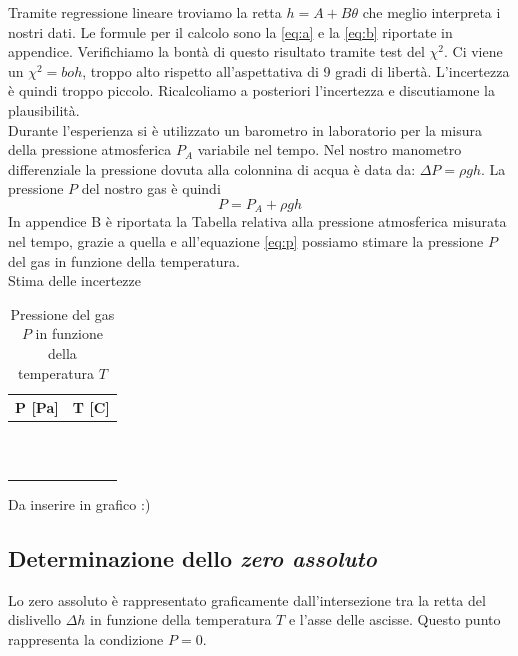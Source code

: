 Tramite regressione lineare troviamo la retta $h = A+B\theta$ che meglio interpreta i nostri dati. 
Le formule per il calcolo sono la \eqref{eq:a} e la \eqref{eq:b} riportate in appendice.
Verifichiamo la bontà di questo risultato tramite test del $\chi^2$. Ci viene un $\chi^2=boh$, troppo alto rispetto all'aspettativa di 9 gradi di libertà.
L'incertezza è quindi troppo piccolo. 
Ricalcoliamo a posteriori l'incertezza e discutiamone la plausibilità.\\
\newline
Durante l'esperienza si è utilizzato un barometro in laboratorio per la misura della pressione atmosferica $P_A$ variabile nel tempo. Nel nostro manometro differenziale la pressione dovuta alla colonnina di acqua è data da: $\Delta P = \rho gh$. 
La pressione $P$ del nostro gas è quindi 
\begin{equation}
\label{eq:p}
P = P_A + \rho gh
\end{equation}
In appendice B è riportata la Tabella relativa alla pressione atmosferica misurata nel tempo, grazie a quella e all'equazione \eqref{eq:p} possiamo stimare la pressione $P$ del gas in funzione della temperatura.\\
Stima delle incertezze\\
\begin{table}[H]
	\centering
	\begin{tabular}{|c|c|} \hline
		\textbf{P {[Pa]} } & \textbf{T {[\degree C]} }  \\ \hline
		 &   \\ \hline
		 &   \\ \hline
		 &   \\ \hline
		 &   \\ \hline
		 &   \\ \hline
		 &   \\ \hline
		 &   \\ \hline
		 &   \\ \hline
		 &   \\ \hline
		 &   \\ \hline
		 &   \\ \hline
	\end{tabular}
	\caption{Pressione del gas $P$ in funzione della temperatura $T$}
\end{table}

Da inserire in grafico :)

\subsection{Determinazione dello \emph{zero assoluto}}
Lo zero assoluto è rappresentato graficamente dall'intersezione tra la retta del dislivello $\Delta h$ in funzione della temperatura $T$ e l'asse delle ascisse.
Questo punto rappresenta la condizione $P = 0$.

